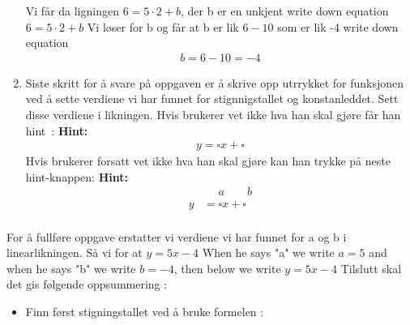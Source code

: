 \documentclass[12pt,twoside,onecolumn]{article}
\begin{document}
\begin{Exercise}
\begin{enumerate}
\begin{figure}[h!]
\end{figure}
{\color{gray} Vi får da ligningen $6=5\cdot 2+b$, der b er en unkjent} \newline
{\color{PineGreen} write down equation 
\newline
$6=5\cdot 2+b$}
\newline
{\color{gray} Vi løser for b og får at b er lik $6-10$ som er lik -4}
\newline
{\color{PineGreen} write down equation
\begin{align}
b=6-10=-4
\end{align}}

\item Siste skritt for å svare på oppgaven er å skrive opp utrrykket for funksjonen ved å sette verdiene vi har funnet for stignnigstallet og konstanleddet.
\newline
Sett disse verdiene i likningen.
\newline
{\color{Maroon} Hvis brukerer vet ikke hva han skal gjøre får han \mbox{hint :}} 
\newline
\newline
\textbf{Hint:}
\begin{align}
y = \square x + \square
\end{align}
{\color{Maroon} Hvis brukerer forsatt vet ikke hva han skal gjøre kan han trykke på neste hint-knappen:}
\newline
\newline
\textbf{Hint:}
\begin{align}
  &\,\,\quad a \qquad b\\ 
y &= \square x + \square\\
\end{align}
\end{enumerate}
{\color{gray}For å fullføre oppgave erstatter vi verdiene vi har funnet for a og b i linearlikningen. Så vi for at $y=5x-4$}
\newline
{\color{PineGreen} When he says "a" we write $a=5$ and when he says "b" we write $b=-4$, then below we write $y=5x-4$} 
\newline
\newline
{\color{Maroon}Tilslutt skal det gis følgende oppsummering :}
\begin{itemize}
\item Finn først stigningstallet ved å bruke formelen :
\begin{align}

\end{align}
\end{itemize}
\end{Exercise}
\end{document}
